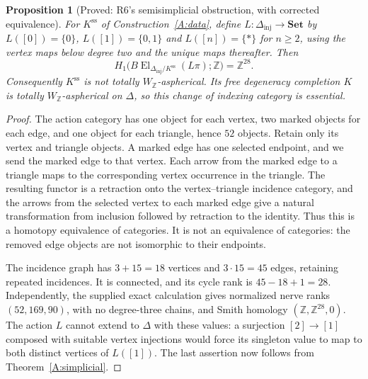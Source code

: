 \documentclass[11pt,a4paper]{article}
\newtheorem{proposition}[theorem]{Proposition}
\theoremstyle{definition}
\theoremstyle{remark}
\newcommand{\Set}{\mathbf{Set}}
\newcommand{\Z}{\mathbb Z}
\newcommand{\WZ}{W_{\mathbb Z}}
\newcommand{\El}{\operatorname{El}}
\begin{document}
\begin{proposition}[Proved: R6's semisimplicial obstruction, with corrected equivalence]\label{A:R6graph}
For $K^{\mathrm{ss}}$ of Construction~\ref{A:data}, define $L:\Delta_{\mathrm{inj}}\to\Set$ by $L([0])=\{0\}$, $L([1])=\{0,1\}$ and $L([n])=\{*\}$ for $n\geq2$, using the vertex maps below degree two and the unique maps thereafter. Then
\[
 H_1\bigl(B\El_{\Delta_{\mathrm{inj}}/K^{\mathrm{ss}}}(L\pi);\Z\bigr)=\Z^{28}.
\]
Consequently $K^{\mathrm{ss}}$ is not totally $\WZ$-aspherical. Its free degeneracy completion $K$ is totally $\WZ$-aspherical on $\Delta$, so this change of indexing category is essential.
\end{proposition}
\begin{proof}
The action category has one object for each vertex, two marked objects for each edge, and one object for each triangle, hence $52$ objects. Retain only its vertex and triangle objects. A marked edge has one selected endpoint, and we send the marked edge to that vertex. Each arrow from the marked edge to a triangle maps to the corresponding vertex occurrence in the triangle. The resulting functor is a retraction onto the vertex--triangle incidence category, and the arrows from the selected vertex to each marked edge give a natural transformation from inclusion followed by retraction to the identity. Thus this is a homotopy equivalence of categories. It is not an equivalence of categories: the removed edge objects are not isomorphic to their endpoints.

The incidence graph has $3+15=18$ vertices and $3\cdot15=45$ edges, retaining repeated incidences. It is connected, and its cycle rank is $45-18+1=28$. Independently, the supplied exact calculation gives normalized nerve ranks $(52,169,90)$, with no degree-three chains, and Smith homology $(\Z,\Z^{28},0)$. The action $L$ cannot extend to $\Delta$ with these values: a surjection $[2]\to[1]$ composed with suitable vertex injections would force its singleton value to map to both distinct vertices of $L([1])$. The last assertion now follows from Theorem~\ref{A:simplicial}.
\end{proof}

\end{document}
